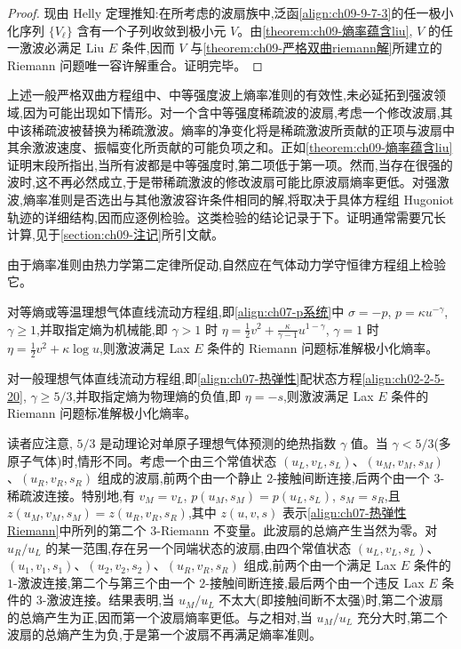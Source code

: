\documentclass[../../main.tex]{subfiles}
\begin{document}
\begin{proof}
现由 Helly 定理推知:在所考虑的波扇族中,泛函\eqref{align:ch09-9-7-3}的任一极小化序列 $\{V_{\ell}\}$ 含有一个子列收敛到极小元 $V$。由\cref{theorem:ch09-熵率蕴含liu}, $V$ 的任一激波必满足 Liu $E$ 条件,因而 $V$ 与\cref{theorem:ch09-严格双曲riemann解}所建立的 Riemann 问题唯一容许解重合。证明完毕。
\end{proof}

上述一般严格双曲方程组中、中等强度波上熵率准则的有效性,未必延拓到强波领域,因为可能出现如下情形。对一个含中等强度稀疏波的波扇,考虑一个修改波扇,其中该稀疏波被替换为稀疏激波。熵率的净变化将是稀疏激波所贡献的正项与波扇中其余激波速度、振幅变化所贡献的可能负项之和。正如\cref{theorem:ch09-熵率蕴含liu}证明末段所指出,当所有波都是中等强度时,第二项低于第一项。然而,当存在很强的波时,这不再必然成立,于是带稀疏激波的修改波扇可能比原波扇熵率更低。对强激波,熵率准则是否选出与其他激波容许条件相同的解,将取决于具体方程组 Hugoniot 轨迹的详细结构,因而应逐例检验。这类检验的结论记录于下。证明通常需要冗长计算,见于\cref{section:ch09-注记}所引文献。

由于熵率准则由热力学第二定律所促动,自然应在气体动力学守恒律方程组上检验它。

\begin{theorem}\label{theorem:ch09-等熵流熵率}
对等熵或等温理想气体直线流动方程组,即\eqref{align:ch07-p系统}中 $\sigma=-p$, $p=\kappa u^{-\gamma}$, $\gamma\geqslant1$,并取指定熵为机械能,即 $\gamma>1$ 时 $\eta=\frac{1}{2}v^{2}+\frac{\kappa}{\gamma-1}u^{1-\gamma}$, $\gamma=1$ 时 $\eta=\frac{1}{2}v^{2}+\kappa\log u$,则激波满足 Lax $E$ 条件的 Riemann 问题标准解极小化熵率。
\end{theorem}

\begin{theorem}\label{theorem:ch09-气体流熵率}
对一般理想气体直线流动方程组,即\eqref{align:ch07-热弹性}配状态方程\eqref{align:ch02-2-5-20}, $\gamma\geqslant5/3$,并取指定熵为物理熵的负值,即 $\eta=-s$,则激波满足 Lax $E$ 条件的 Riemann 问题标准解极小化熵率。
\end{theorem}

读者应注意, $5/3$ 是动理论对单原子理想气体预测的绝热指数 $\gamma$ 值。当 $\gamma<5/3$(多原子气体)时,情形不同。考虑一个由三个常值状态 $(u_{L},v_{L},s_{L})$、$(u_{M},v_{M},s_{M})$、$(u_{R},v_{R},s_{R})$ 组成的波扇,前两个由一个静止 $2$-接触间断连接,后两个由一个 $3$-稀疏波连接。特别地,有 $v_{M}=v_{L}$, $p(u_{M},s_{M})=p(u_{L},s_{L})$, $s_{M}=s_{R}$,且 $z(u_{M},v_{M},s_{M})=z(u_{R},v_{R},s_{R})$,其中 $z(u,v,s)$ 表示\eqref{align:ch07-热弹性Riemann}中所列的第二个 $3$-Riemann 不变量。此波扇的总熵产生当然为零。对 $u_{R}/u_{L}$ 的某一范围,存在另一个同端状态的波扇,由四个常值状态 $(u_{L},v_{L},s_{L})$、$(u_{1},v_{1},s_{1})$、$(u_{2},v_{2},s_{2})$、$(u_{R},v_{R},s_{R})$ 组成,前两个由一个满足 Lax $E$ 条件的 $1$-激波连接,第二个与第三个由一个 $2$-接触间断连接,最后两个由一个违反 Lax $E$ 条件的 $3$-激波连接。结果表明,当 $u_{M}/u_{L}$ 不太大(即接触间断不太强)时,第二个波扇的总熵产生为正,因而第一个波扇熵率更低。与之相对,当 $u_{M}/u_{L}$ 充分大时,第二个波扇的总熵产生为负,于是第一个波扇不再满足熵率准则。
\end{document}

